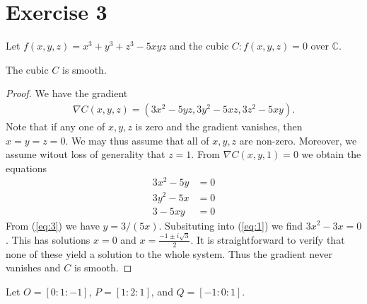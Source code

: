 \documentclass{article}
\begin{document}
\section*{Exercise 3}

Let $f(x,y,z)=x^3 + y^3 + z^3 - 5xyz$ and the cubic $C:f(x,y,z)=0$ over $\mathbb C$.

\begin{claim*}[1]
  The cubic $C$ is smooth.
  \begin{proof}
    We have the gradient
    \begin{align*}
      \nabla C(x,y,z) = (3x^2-5yz,3y^2-5xz,3z^2-5xy).
    \end{align*}
    Note that if any one of $x,y,z$ is zero and the gradient vanishes, then
    $x=y=z=0$. We may thus assume that all of $x,y,z$ are non-zero. Moreover,
    we assume witout loss of generality that $z=1$. From $\nabla C(x,y,1)=0$ we
    obtain the equations
    \begin{align}
      \label{eq:1}
      3x^2 - 5y &= 0\\
      3y^2 - 5x &= 0\\
      \label{eq:3}
      3 - 5xy &= 0
    \end{align}
    From (\ref{eq:3}) we have $y=3/(5x)$. Subsituting into (\ref{eq:1}) we find
    $3x^2-3x=0$. This has solutions $x=0$ and $x=\frac{-1\pm i\sqrt{3}}{2}$. It is
    straightforward to verify that none of these yield a solution to the whole system.
    Thus the gradient never vanishes and $C$ is smooth.
  \end{proof}
\end{claim*}

Let $O=[0:1:-1]$, $P=[1:2:1]$, and $Q=[-1:0:1]$.
\end{document}
